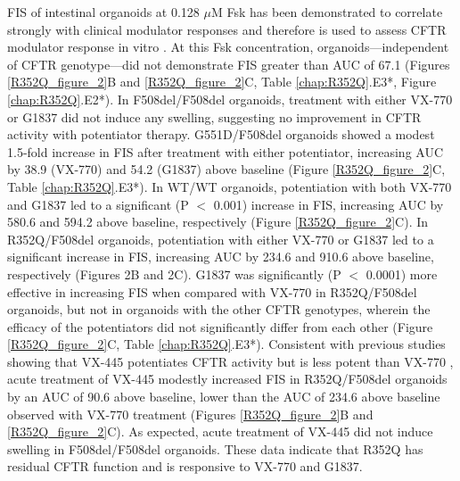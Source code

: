 FIS of intestinal organoids at 0.128 $\mu$M Fsk has been demonstrated to correlate strongly with clinical modulator responses and therefore is used to assess CFTR modulator response in vitro \cite{dekkers2016}. At this Fsk concentration, organoids—independent of CFTR genotype—did not demonstrate FIS greater than AUC of 67.1 (Figures \ref{R352Q_figure_2}B and \ref{R352Q_figure_2}C, Table \ref{chap:R352Q}.E3*, Figure \ref{chap:R352Q}.E2*). In F508del/F508del organoids, treatment with either VX-770 or G1837 did not induce any swelling, suggesting no improvement in CFTR activity with potentiator therapy. G551D/F508del organoids showed a modest 1.5-fold increase in FIS after treatment with either potentiator, increasing AUC by 38.9 (VX-770) and 54.2 (G1837) above baseline (Figure \ref{R352Q_figure_2}C, Table \ref{chap:R352Q}.E3*). In WT/WT organoids, potentiation with both VX-770 and G1837 led to a significant (P $<$ 0.001) increase in FIS, increasing AUC by 580.6 and 594.2 above baseline, respectively (Figure \ref{R352Q_figure_2}C). In R352Q/F508del organoids, potentiation with either VX-770 or G1837 led to a significant increase in FIS, increasing AUC by 234.6 and 910.6 above baseline, respectively (Figures 2B and 2C). G1837 was significantly (P $<$ 0.0001) more effective in increasing FIS when compared with VX-770 in R352Q/F508del organoids, but not in organoids with the other CFTR genotypes, wherein the efficacy of the potentiators did not significantly differ from each other (Figure \ref{R352Q_figure_2}C, Table \ref{chap:R352Q}.E3*). Consistent with previous studies showing that VX-445 potentiates CFTR activity but is less potent than VX-770 \cite{shaughnessy2021,laselva2021,veit2021}, acute treatment of VX-445 modestly increased FIS in R352Q/F508del organoids by an AUC of 90.6 above baseline, lower than the AUC of 234.6 above baseline observed with VX-770 treatment (Figures \ref{R352Q_figure_2}B and \ref{R352Q_figure_2}C). As expected, acute treatment of VX-445 did not induce swelling in F508del/F508del organoids. These data indicate that R352Q has residual CFTR function and is responsive to VX-770 and G1837.

